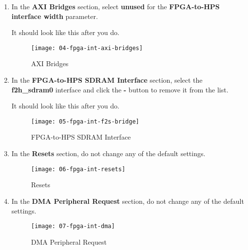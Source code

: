 \begin{flushleft}
\begin{enumerate}[
	label=\textbf{Step \arabic*.},
	leftmargin=*,
	widest={00},
	align=left]
\item In the \textbf{AXI Bridges} section, select \textbf{unused} for the \textbf{FPGA-to-HPS interface width} parameter.

It should look like this after you do.

\begin{figure}[H]
\centering
\texttt{[image: 04-fpga-int-axi-bridges]}
\caption{AXI Bridges}
\label{fig:04-fpga-int-axi-bridges}
\end{figure}

\item In the \textbf{FPGA-to-HPS SDRAM Interface} section, select the \textbf{f2h\_sdram0} interface and click the \textbf{-} button to remove it from the list.

It should look like this after you do.

\begin{figure}[H]
\centering
\texttt{[image: 05-fpga-int-f2s-bridge]}
\caption{FPGA-to-HPS SDRAM Interface}
\label{fig:05-fpga-int-f2s-bridge}
\end{figure}

\newpage

\item In the \textbf{Resets} section, do not change any of the default settings.

\begin{figure}[H]
\centering
\texttt{[image: 06-fpga-int-resets]}
\caption{Resets}
\label{fig:06-fpga-int-resets}
\end{figure}

\item In the \textbf{DMA Peripheral Request} section, do not change any of the default settings.

\begin{figure}[H]
\centering
\texttt{[image: 07-fpga-int-dma]}
\caption{DMA Peripheral Request}
\label{fig:07-fpga-int-dma}
\end{figure}


\end{enumerate}
\end{flushleft}
